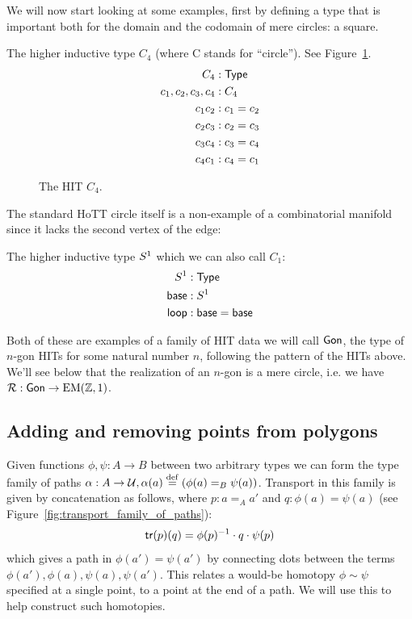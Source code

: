 We will now start looking at some examples, first by defining a type that is important both for the domain and the codomain of mere circles: a square.

\begin{mydef}
The higher inductive type \( C_4 \) (where C stands for ``circle''). See Figure~\ref{fig:c4}.
\begin{align*}
C_4 &: \mathsf{Type} \\
c_1, c_2, c_3, c_4 &: C_4 \\
c_1c_2 &: c_1 = c_2 \\
c_2c_3 &: c_2 = c_3 \\
c_3c_4 &: c_3 = c_4 \\
c_4c_1 &: c_4 = c_1 \\
\end{align*}
\end{mydef}

\begin{figure}[htbp]
\centering

\caption{The HIT \( C_4 \).}
\label{fig:c4}
\end{figure}

The standard HoTT circle itself is a non-example of a combinatorial manifold since it lacks the second vertex of the edge:

\begin{mydef}
The higher inductive type \( S^1 \) which we can also call \( C_1 \):
\begin{align*}
S^1 &:\mathsf{Type} \\
\mathsf{base}&:S^1 \\
\mathsf{loop}&:\mathsf{base}=\mathsf{base}
\end{align*}
\end{mydef}

Both of these are examples of a family of HIT data we will call \( \mathsf{Gon} \), the type of \( n \)-gon HITs for some natural number \( n \), following the pattern of the HITs above. We'll see below that the realization of an \( n \)-gon is a mere circle, i.e. we have \( \mathcal{R}:\mathsf{Gon}\to \mathrm{EM}(\mathbb{Z},1) \).

\subsection{Adding and removing points from polygons}
Given functions \( \phi,\psi:A\to B \) between two arbitrary types we can form the type family of paths \( \alpha:A\to\mathcal{U}, \alpha(a)\stackrel{\mathrm{def}}{=}(\phi(a)=_B\psi(a)) \). Transport in this family is given by concatenation as follows, where \( p:a=_A a' \) and \( q:\phi(a)=\psi(a) \) (see Figure~\ref{fig:transport_family_of_paths}):
\[ 
\mathsf{tr}(p)(q) = \phi(p)^{-1}\cdot q\cdot \psi(p)
\]
which gives a path in \( \phi(a')=\psi(a') \) by connecting dots between the terms \( \phi(a'), \phi(a), \psi(a), \psi(a') \). This relates a would-be homotopy \( \phi\sim\psi \) specified at a single point, to a point at the end of a path. We will use this to help construct such homotopies.

